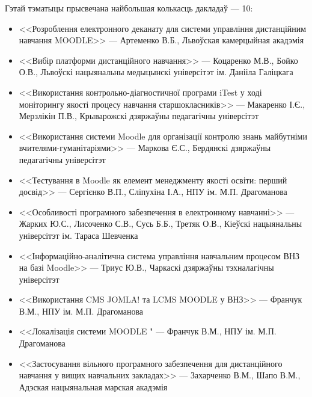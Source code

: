 \documentclass[10pt, a5paper]{article}
\begin{document}
Гэтай тэматыцы прысвечана найбольшая колькасць дакладаў --- 10:
\begin{itemize}
\item <<Розроблення електронного деканату для системи управління дистанційним навчання MOODLE>> --- Артеменко В.Б., Львоўская камерцыйная акадэмія
\item <<Вибір платформи дистанційного навчання>> --- Коцаренко М.В., Бойко О.В.,  Львоўскі нацыянальны медыцынскі універсітэт ім. Данііла Галіцкага
\item <<Використання контрольно-діагностичної програми iTest у ході моніторингу якості процесу навчання старшокласників>> --- Макаренко І.Є., Мерзлікін П.В., Крыварожскі дзяржаўны педагагічны універсітэт
\item  <<Використання системи Moodle для організації контролю знань майбутніми вчителями-гуманітаріями>> --- Маркова Є.С., Бердянскі дзяржаўны педагагічны універсітэт
\item  <<Тестування в  Moodle як елемент менеджменту якості освіти: перший досвід>> --- Сергієнко В.П., Сліпухіна І.А., НПУ ім. М.П. Драгоманова
\item  <<Особливості програмного забезпечення в електронному навчанні>> --- Жарких Ю.С., Лисоченко С.В., Сусь Б.Б., Третяк О.В., Кіеўскі нацыянальны універсітэт ім. Тараса Шевченка
\item  <<Інформаційно-аналітична система управління навчальним процесом ВНЗ на базі  Moodle>> --- Триус Ю.В., Чаркаскі дзяржаўны тэхналагічны універсітэт
\item  <<Використання CMS JOMLA!  та LCMS MOODLE у ВНЗ>> --- Франчук В.М., НПУ ім. М.П. Драгоманова
\item <<Локалізація системи MOODLE " --- Франчук В.М., НПУ ім. М.П. Драгоманова
\item  <<Застосування вільного програмного забезпечення для дистанційного навчання у вищих навчальних закладах>> --- Захарченко В.М., Шапо В.М., Адэская нацыянальная марская акадэмія
\end{itemize}
\end{document}
